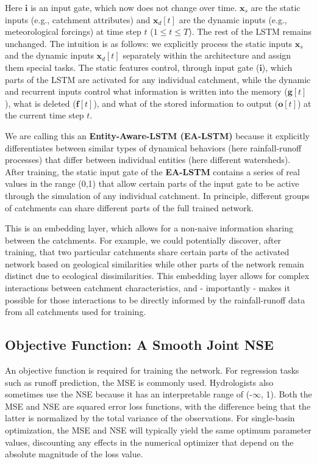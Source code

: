 Here $\bm{i}$ is an input gate, which now does not change over time. $\bm{x}_s$ are the static inputs (e.g., catchment attributes) and $\bm{x}_d[t]$ are the dynamic inputs (e.g., meteorological forcings) at time step $t$ ($1 \leq t \leq T$). The rest of the \gls{LSTM} remains unchanged. The intuition is as follows: we explicitly process the static inputs $\bm{x}_s$ and the dynamic inputs $\bm{x}_d[t]$ separately within the architecture and assign them special tasks. The static features control, through input gate ($\bm{i}$), which parts of the LSTM are activated for any individual catchment, while the dynamic and recurrent inputs control what information is written into the memory ($\bm{g}[t]$), what is deleted ($\bm{f}[t]$), and what of the stored information to output ($\bm{o}[t]$) at the current time step $t$. 

We are calling this an \textbf{Entity-Aware-LSTM (EA-LSTM)} because it explicitly differentiates between similar types of dynamical behaviors (here rainfall-runoff processes) that differ between individual entities (here different watersheds). After training, the static input gate of the \textbf{\gls{EA-LSTM}} contains a series of real values in the range (0,1) that allow certain parts of the input gate to be active through the simulation of any individual catchment. In principle, different groups of catchments can share different parts of the full trained network.

This is an embedding layer, which allows for a non-naive information sharing between the catchments. For example, we could potentially discover, after training, that two particular catchments share certain parts of the activated network based on geological similarities while other parts of the network remain distinct due to ecological dissimilarities. This embedding layer allows for complex interactions between catchment characteristics, and - importantly - makes it possible for those interactions to be directly informed by the rainfall-runoff data from all catchments used for training.

\subsection{Objective Function: A Smooth Joint NSE}\label{sec-nse}

An objective function is required for training the network. For regression tasks such as runoff prediction, the  \gls{MSE} is commonly used. Hydrologists also sometimes use the \gls{NSE} because it has an interpretable range of (-$\infty$, 1). Both the \gls{MSE} and \gls{NSE} are squared error loss functions, with the difference being that the latter is normalized by the total variance of the observations. For single-basin optimization, the \gls{MSE} and \gls{NSE} will typically yield the same optimum parameter values, discounting any effects in the numerical optimizer that depend on the absolute magnitude of the loss value.

